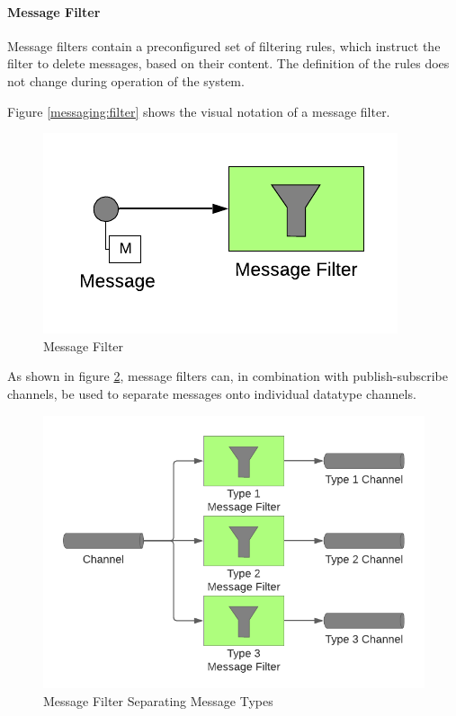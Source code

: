 \paragraph{Message Filter}

Message filters contain a preconfigured set of filtering rules, which instruct the filter to delete messages, based on their content. The definition of the rules does not change during operation of the system.

Figure \ref{messaging:filter} shows the visual notation of a message filter.

\begin{figure}[H]
    \centering
    \includegraphics[scale=0.6]{Diagrams/Messaging/8. Message Filter.pdf}
    \caption{Message Filter}
    \label{messaging:filter1}
\end{figure}

As shown in figure \ref{messaging:filter2}, message filters can, in combination with publish-subscribe channels, be used to separate messages onto individual datatype channels.

\begin{figure}[H]
    \centering
    \includegraphics[scale=0.6]{Diagrams/Messaging/9. Message Filter.pdf}
    \caption{Message Filter Separating Message Types}
    \label{messaging:filter2}
\end{figure}


